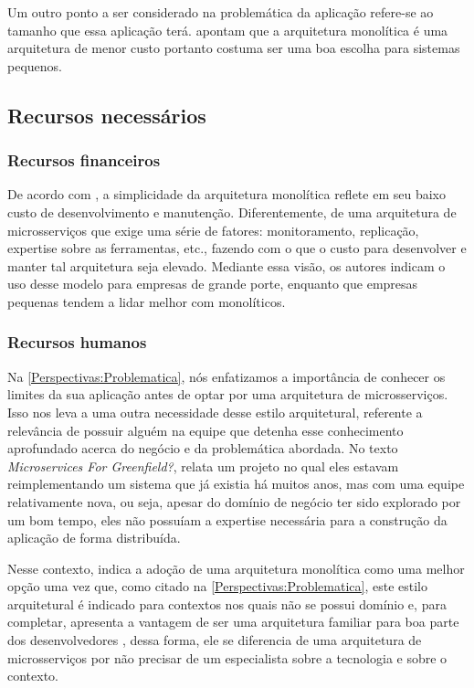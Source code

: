 Um outro ponto a ser considerado na problemática da aplicação refere-se ao tamanho que essa
aplicação terá.  apontam que a arquitetura
monolítica é uma arquitetura de menor custo portanto costuma ser uma boa escolha para sistemas
pequenos.

\subsection{Recursos necessários}

\subsubsection{Recursos financeiros}
\label{Perspectivas:recursosFinanceiros}

De acordo com , a simplicidade da arquitetura
monolítica reflete em seu baixo custo de desenvolvimento e manutenção. Diferentemente, de uma arquitetura
de microsserviços que exige uma série de fatores: monitoramento, replicação, expertise sobre as
ferramentas, etc., fazendo com o que o custo para desenvolver e manter tal arquitetura seja elevado.
Mediante essa visão, os autores indicam o uso desse modelo para empresas de grande porte,
enquanto que empresas pequenas tendem a lidar melhor com monolíticos.

\subsubsection{Recursos humanos}
\label{Perspectivas:recursosHumanos}

Na \autoref{Perspectivas:Problematica}, nós enfatizamos a importância de conhecer os limites da
sua aplicação antes de optar por uma arquitetura de microsserviços. Isso nos leva a uma outra necessidade desse
estilo arquitetural, referente a relevância de possuir alguém na equipe que detenha esse conhecimento
aprofundado acerca do negócio e da problemática abordada. No texto \textit{Microservices For
Greenfield?},  relata um projeto no qual eles estavam reimplementando
um sistema que já existia há muitos anos, mas com uma equipe relativamente nova, ou seja, apesar do
domínio de negócio ter sido explorado por um bom tempo, eles não possuíam a expertise necessária
para a construção da aplicação de forma distribuída.

Nesse contexto,  indica a adoção de uma arquitetura monolítica como uma
melhor opção uma vez que, como citado na \autoref{Perspectivas:Problematica}, este estilo arquitetural
é indicado para contextos nos quais não se possui domínio e, para completar, apresenta a vantagem de ser uma
arquitetura familiar para boa parte dos desenvolvedores
\cite{Richards2020:FundamentalsOfSoftwareArchitecture}, dessa forma, ele se diferencia de uma
arquitetura de microsserviços por não precisar de um especialista sobre a tecnologia e sobre o contexto.



